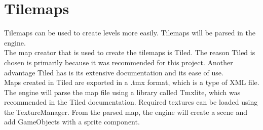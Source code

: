 \section{Tilemaps}
\label{sec:tilemaps}
Tilemaps can be used to create levels more easily.
Tilemaps will be parsed in the engine.
\\
The map creator that is used to create the tilemaps is Tiled.
The reason Tiled is chosen is primarily because it was recommended for this project.
Another advantage Tiled has is its extensive documentation and its ease of use.
\\
Maps created in Tiled are exported in a .tmx format, which is a type of XML file.
The engine will parse the map file using a library called Tmxlite, which was recommended in the Tiled documentation.
Required textures can be loaded using the TextureManager.
From the parsed map, the engine will create a scene and add GameObjects with a sprite component.